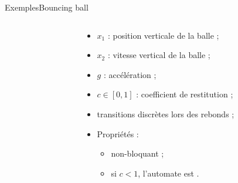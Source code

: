 \documentclass[compress]{beamer}
\begin{document}
\begin{frame}{Exemples}{Bouncing ball}
\begin{columns}
\begin{column}{0.35\linewidth}
\end{column}
\begin{column}{0.65\linewidth}
	\begin{itemize}
	\item $x_1$ : position verticale de la balle ;
	\item $x_2$ : vitesse vertical de la balle ;
	\item $g$ : accélération ;
	\item $c \in [0, 1]$ : coefficient de restitution ;
	\item transitions discrètes lors des rebonds ;
	\item Propriétés :
		\begin{itemize}
		\item non-bloquant ;
		\item si $c < 1$, l'automate est .
		\end{itemize}
	\end{itemize}
\end{column}
\end{columns}
\end{frame}
\end{document}
